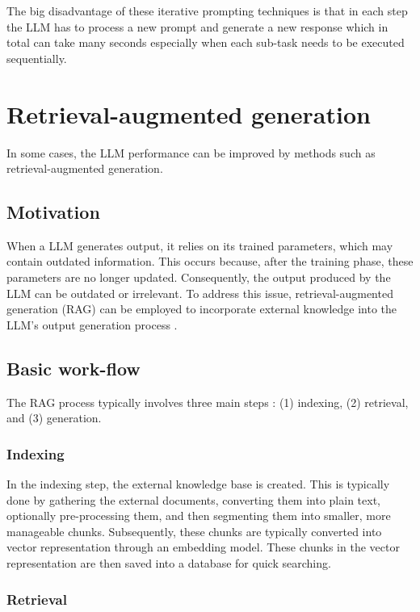 The big disadvantage of these iterative prompting techniques is that in each step the LLM has to process a new prompt and generate a new response which in total can take many seconds especially when each sub-task needs to be executed sequentially.


\section{Retrieval-augmented generation}

In some cases, the LLM performance can be improved by methods such as retrieval-augmented generation.

\subsection{Motivation}

When a LLM generates output, it relies on its trained parameters, which may contain outdated information. This occurs because, after the training phase, these parameters are no longer updated. Consequently, the output produced by the LLM can be outdated or irrelevant. To address this issue, retrieval-augmented generation (RAG) can be employed to incorporate external knowledge into the LLM's output generation process \cite{Gao2023}.


\subsection{Basic work-flow}

The RAG process typically involves three main steps \cite{Gao2023}: (1) indexing, (2) retrieval, and (3) generation.

\subsubsection{Indexing}

In the indexing step, the external knowledge base is created. This is typically done by gathering the external documents, converting them into plain text, optionally pre-processing them, and then segmenting them into smaller, more manageable chunks. Subsequently, these chunks are typically converted into vector representation through an embedding model. These chunks in the vector representation are then saved into a database for quick searching.


\subsubsection{Retrieval}

